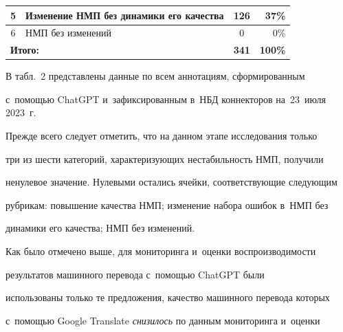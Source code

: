 \begin{table}[b]
\begin{center}
\begin{tabular}{|c|l|c|r|}
\hline


5&Изменение НМП без динамики его качества&126&37\%\hspace*{10mm}\\


\hline


6&НМП без изменений&0&0\%\hspace*{10mm}\\


\hline


\multicolumn{2}{|l|}{\textbf{Итого:}}&\textbf{341}&\textbf{100\%}\hspace*{10mm}\\


\hline


\end{tabular}


\end{center}




\end{table}





   


   В табл.~2 представлены данные по всем аннотациям, сформированным 


с~по\-мощью \mbox{ChatGPT} и~зафиксированным в~НБД коннекторов на~23~июля 2023~г. 


   


   Прежде всего следует отметить, что на данном этапе исследования только 


три из шести категорий, ха\-рак\-те\-ри\-зу\-ющих не\-ста\-биль\-ность НМП, получили 


ненулевое значение. Нулевыми остались ячейки, со\-от\-вет\-ст\-ву\-ющие сле\-ду\-ющим 


руб\-ри\-кам: повышение качества НМП; изменение набора ошибок в~НМП без 


динамики его качества; НМП без изменений. 


   


   Как было отмечено выше, для мониторинга и~оценки вос\-про\-из\-во\-ди\-мости 


результатов машинного перевода с~по\-мощью \mbox{ChatGPT} были 


использованы только те предложения, качество машинного перевода которых 


с~по\-мощью \mbox{Google} Translate \textit{снизилось} по данным мониторинга и~оценки 


